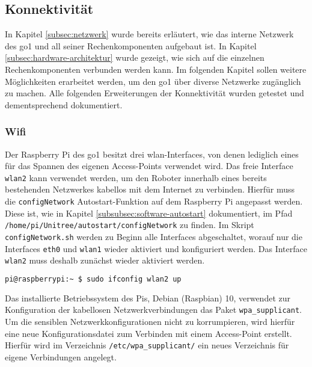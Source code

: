\subsection{Konnektivität}
\label{subsec:konnektivitat}

In Kapitel \ref{subsec:netzwerk} wurde bereits erläutert, wie das interne Netzwerk des \gls{go1} und all seiner
Rechenkomponenten aufgebaut ist.
In Kapitel \ref{subsec:hardware-architektur} wurde gezeigt, wie sich auf die einzelnen Rechenkomponenten verbunden werden kann.
Im folgenden Kapitel sollen weitere Möglichkeiten erarbeitet werden, um den \gls{go1} über diverse Netzwerke zugänglich zu machen.
Alle folgenden Erweiterungen der Konnektivität wurden getestet und dementsprechend dokumentiert.

\subsubsection*{Wifi}
\label{subsubsec:wifi}

Der Raspberry Pi des \gls{go1} besitzt drei \gls{wlan}-Interfaces, von denen lediglich eines für das Spannen des eigenen
Access-Points verwendet wird.
Das freie Interface \texttt{wlan2} kann verwendet werden, um den Roboter innerhalb eines bereits bestehenden Netzwerkes kabellos
mit dem Internet zu verbinden.
Hierfür muss die \texttt{configNetwork} Autostart-Funktion auf dem Raspberry Pi angepasst werden.
Diese ist, wie in Kapitel \ref{subsubsec:software-autostart} dokumentiert, im Pfad
\texttt{/home/\allowbreak pi/\allowbreak Unitree/\allowbreak autostart/\allowbreak configNetwork} zu finden.
Im Skript \texttt{configNetwork.sh} werden zu Beginn alle Interfaces abgeschaltet, worauf nur die Interfaces \texttt{eth0}
und \texttt{wlan1} wieder aktiviert und konfiguriert werden.
Das Interface \texttt{wlan2} muss deshalb zunächst wieder aktiviert werden.

\begin{lstlisting}[language=Bash]
pi@raspberrypi:~ $ sudo ifconfig wlan2 up
\end{lstlisting}


Das installierte Betriebssystem des Pis, Debian (Raspbian) \num{10}, verwendet zur Konfiguration der kabellosen Netzwerkverbindungen
das Paket \texttt{wpa\_supplicant}.
Um die sensiblen Netzwerkkonfigurationen nicht zu korrumpieren, wird hierfür eine neue Konfigurationsdatei zum Verbinden
mit einem Access-Point erstellt.
Hierfür wird im Verzeichnis \texttt{/etc/wpa\_supplicant/} ein neues Verzeichnis für eigene Verbindungen angelegt.

